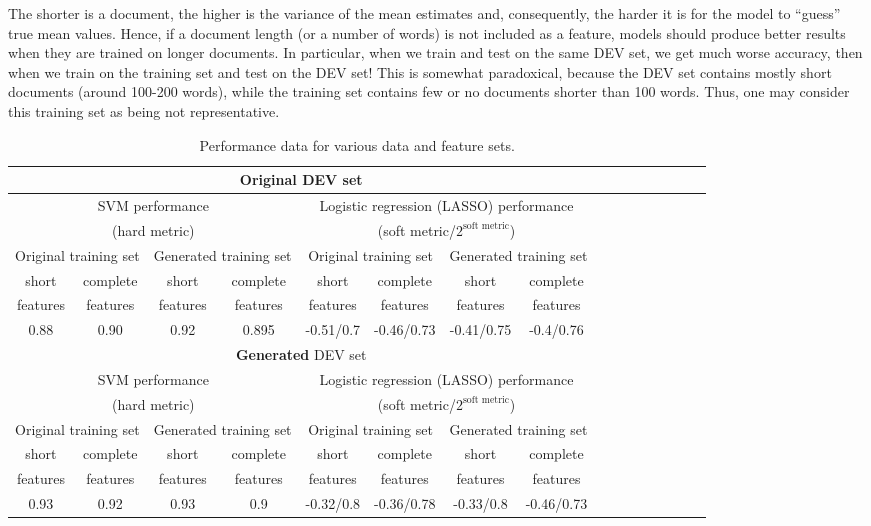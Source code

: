 \documentclass[11pt]{article}
\begin{document}
The shorter is a document, the higher is the variance of the mean estimates
and, consequently, the harder it is for the model to ``guess'' true mean values.
Hence, if a document length (or a number of words)
is not included as a feature,
models should produce better results when they are trained on longer documents.
In particular, when we train and test on the same DEV set, we get much worse
accuracy, then when we train on the training set and test on the DEV set!
This is somewhat paradoxical, because the DEV set contains mostly short documents (around 100-200 words),
 while the training set contains few or no documents shorter than 100 words.
Thus, one may consider this training set as being not representative.

\begin{table}
\caption{\label{TablePerf}  Performance data for various data and feature sets.}
\begin{tabular}{c|c|c|c|c|c|c|c|c|c|c|c|c|c|c|c}\hline
\multicolumn{8}{c}{\textbf{Original} DEV set} \\\hline\hline
\multicolumn{4}{c|}{SVM performance } & \multicolumn{4}{c}{Logistic regression (LASSO) performance } \\
\multicolumn{4}{c|}{(hard metric)} & \multicolumn{4}{c}{(soft metric/$2^{\mbox{soft metric}}$)} \\\hline\hline
\multicolumn{2}{c|}{Original training set} & \multicolumn{2}{c|}{Generated training set} 
&
\multicolumn{2}{c|}{Original training set} & \multicolumn{2}{c}{Generated training set} 
\\\hline
short & complete & short & complete  &
short & complete & short & complete  \\
features & features & features & features &
features & features & features & features \\\hline
0.88  & 0.90 & 0.92 &  0.895  & -0.51/0.7 & -0.46/0.73 & -0.41/0.75 & -0.4/0.76

\\\hline
\multicolumn{8}{c}{\textbf{Generated} DEV set} \\\hline\hline
\multicolumn{4}{c|}{SVM performance } & \multicolumn{4}{c}{Logistic regression (LASSO) performance } \\
\multicolumn{4}{c|}{(hard metric)} & \multicolumn{4}{c}{(soft metric/$2^{\mbox{soft metric}}$)} \\\hline\hline
\multicolumn{2}{c|}{Original training set} & \multicolumn{2}{c|}{Generated training set} &
\multicolumn{2}{c|}{Original training set} & \multicolumn{2}{c}{Generated training set} \\\hline
short & complete & short & complete  &
short & complete & short & complete  \\
features & features & features & features &
features & features & features & features \\\hline
0.93 & 0.92   & 0.93 & 0.9  & -0.32/0.8  & -0.36/0.78 & -0.33/0.8 & -0.46/0.73\\\hline
\end{tabular}
\end{table}
\end{document}
